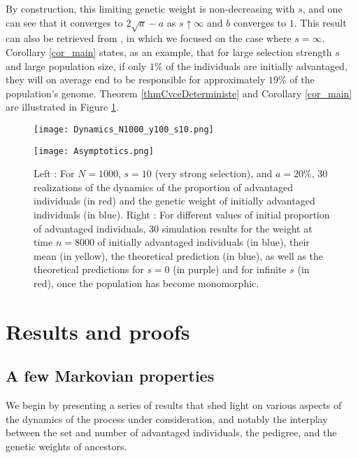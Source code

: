 \documentclass[11pt]{article}
\theoremstyle{remark}
\numberwithin{equation}{section}
\begin{document}
By construction, this limiting genetic weight is non-decreasing with $s$, and one can see that it converges to $2\sqrt{a}-a$ as $s\uparrow \infty$ and $b$ converges to $1$. This result can also be retrieved from \cite{CoronLeJan22}, in which we focused on the case where $s=\infty$. Corollary \ref{cor_main} states, as an example, that for large selection strength $s$ and large population size, if only $1\%$ of the individuals are initially advantaged, they will on average end to be responsible for approximately $19\%$ of the population's genome. Theorem \ref{thmCvceDeterministe} and Corollary \ref{cor_main} are illustrated in Figure \ref{fig:simulations}.

\begin{figure}
\centering
\begin{minipage}{0.6\textwidth}
    \texttt{[image: Dynamics\_N1000\_y100\_s10.png]}
\end{minipage}\quad
\begin{minipage}{0.35\textwidth}
    \texttt{[image: Asymptotics.png]}
\end{minipage}
 \caption{Left : For $N=1000$, $s=10$ (very strong selection), and $a=20\%$, $30$ realizations of the dynamics of the proportion of advantaged individuals (in red) and the genetic weight of initially advantaged individuals (in blue). Right : For different values of initial proportion of advantaged individuals, $30$ simulation results for the weight at time $n=8000$ of initially advantaged individuals (in blue), their mean (in yellow), the theoretical prediction (in blue), as well as the theoretical predictions for $s=0$ (in purple) and for infinite $s$ (in red), once the population has become monomorphic.}    \label{fig:simulations}
\end{figure}

\section{Results and proofs}
\subsection{A few Markovian properties}

We begin by presenting a series of results that shed light on various aspects of the dynamics of the process under consideration, and notably the interplay between the set and number of advantaged individuals, the pedigree, and the genetic weights of ancestors. 
\end{document}
